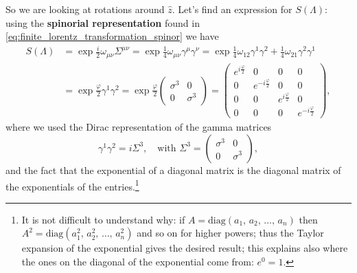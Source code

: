 \begin{example}
    So we are looking at rotations around \(\hat{z}\). Let's find an expression for \(S(\Lambda)\): using the \textbf{spinorial representation} found in \eqref{eq:finite_lorentz_transformation_spinor} we have
    \[
        \begin{aligned}
            S(\Lambda) & = \exp{\frac{i}{2} \omega_{\mu \nu} \Sigma^{\mu \nu}} = \exp{\frac{1}{4} \omega_{\mu \nu} \gamma^{\mu} \gamma^{\nu}} = \exp{\frac{1}{4}\omega_{12}\gamma^1 \gamma^2 + \frac{1}{4}\omega_{21}\gamma^2 \gamma^1} \\
                       & = \exp{\frac{\varphi}{2} \gamma^1 \gamma^2} = \exp{\frac{\varphi}{2} \begin{pmatrix}
                                                                                                      \sigma^3 & 0        \\
                                                                                                      0        & \sigma^3
                                                                                                  \end{pmatrix}} = \begin{pmatrix}
                                                                                                                   e^{i \frac{\varphi}{2}} & 0                         & 0                       & 0                        \\
                                                                                                                   0                       & e^{-i \frac{\varphi}{2} } & 0                       & 0                        \\
                                                                                                                   0                       & 0                         & e^{i \frac{\varphi}{2}} & 0                        \\
                                                                                                                   0                       & 0                         & 0                       & e^{-i \frac{\varphi}{2}}
                                                                                                               \end{pmatrix},
        \end{aligned}
    \]
    where we used the Dirac representation of the gamma matrices
    \[
        \gamma^1 \gamma^2 = i \Sigma^3, \quad \text{with } \Sigma^3 = \begin{pmatrix}
            \sigma^3 & 0        \\
            0        & \sigma^3
        \end{pmatrix},
    \]
    and the fact that the exponential of a diagonal matrix is the diagonal matrix of the exponentials of the entries.\footnote{It is not difficult to understand why: if \(A = \mathrm{diag}(a_1,\, a_2,\, \dots,\, a_n)\) then \(A^2 = \mathrm{diag}(a_1^2,\, a_2^2,\, \dots,\, a_n^2)\) and so on for higher powers; thus the Taylor expansion of the exponential gives the desired result; this explains also where the ones on the diagonal of the exponential come from: \(e^0 = 1\).}


\end{example}
